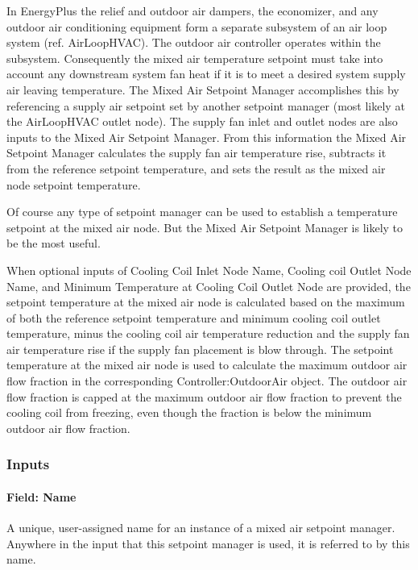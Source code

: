 In EnergyPlus the relief and outdoor air dampers, the economizer, and any outdoor air conditioning equipment form a separate subsystem of an air loop system (ref. AirLoopHVAC). The outdoor air controller operates within the subsystem. Consequently the mixed air temperature setpoint must take into account any downstream system fan heat if it is to meet a desired system supply air leaving temperature. The Mixed Air Setpoint Manager accomplishes this by referencing a supply air setpoint set by another setpoint manager (most likely at the AirLoopHVAC outlet node). The supply fan inlet and outlet nodes are also inputs to the Mixed Air Setpoint Manager. From this information the Mixed Air Setpoint Manager calculates the supply fan air temperature rise, subtracts it from the reference setpoint temperature, and sets the result as the mixed air node setpoint temperature.

Of course any type of setpoint manager can be used to establish a temperature setpoint at the mixed air node. But the Mixed Air Setpoint Manager is likely to be the most useful.

When optional inputs of Cooling Coil Inlet Node Name, Cooling coil Outlet Node Name, and Minimum Temperature at Cooling Coil Outlet Node are provided, the setpoint temperature at the mixed air node is calculated based on the maximum of both the reference setpoint temperature and minimum cooling coil outlet temperature, minus the cooling coil air temperature reduction and the supply fan air temperature rise if the supply fan placement is blow through. The setpoint temperature at the mixed air node is used to calculate the maximum outdoor air flow fraction in the corresponding Controller:OutdoorAir object. The outdoor air flow fraction is capped at the maximum outdoor air flow fraction to prevent the cooling coil from freezing, even though the fraction is below the minimum outdoor air flow fraction.

\subsubsection{Inputs}\label{inputs-8-022}

\paragraph{Field: Name}\label{field-name-8-019}

A unique, user-assigned name for an instance of a mixed air setpoint manager. Anywhere in the input that this setpoint manager is used, it is referred to by this name.

